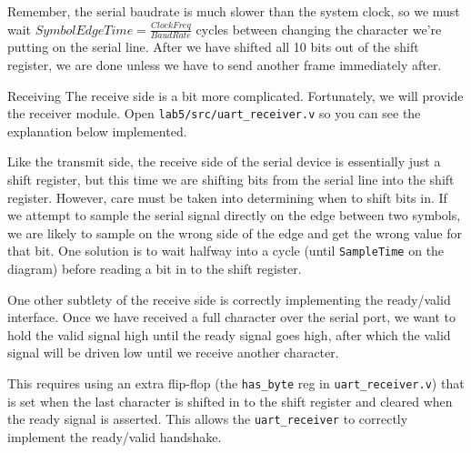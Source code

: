 \documentclass[11pt]{article}
\makeatletter
\renewcommand{\subsection}
{\@startsection {subsection}{1}{0pt}
 {-1ex}
 {0.5ex}
 {\bfseries\normalsize}}
\makeatother
\begin{document}
Remember, the serial baudrate is much slower than the system clock, so we must wait $SymbolEdgeTime = \frac{ClockFreq}{BaudRate}$ cycles between changing the character we're putting on the serial line.
After we have shifted all 10 bits out of the shift register, we are done unless we have to send another frame immediately after.

\subsection{Receiving}
The receive side is a bit more complicated.
Fortunately, we will provide the receiver module.
Open \verb|lab5/src/uart_receiver.v| so you can see the explanation below implemented.

Like the transmit side, the receive side of the serial device is essentially just a shift register, but this time we are shifting bits from the serial line into the shift register.
However, care must be taken into determining when to shift bits in.
If we attempt to sample the serial signal directly on the edge between two symbols, we are likely to sample on the wrong side of the edge and get the wrong value for that bit.
One solution is to wait halfway into a cycle (until \verb|SampleTime| on the diagram) before reading a bit in to the shift register.

One other subtlety of the receive side is correctly implementing the ready/valid interface.
Once we have received a full character over the serial port, we want to hold the valid signal high until the ready signal goes high, after which the valid signal will be driven low until we receive another character.

This requires using an extra flip-flop (the \verb|has_byte| reg in \verb|uart_receiver.v|) that is set when the last character is shifted in to the shift register and cleared when the ready signal is asserted.
This allows the \verb|uart_receiver| to correctly implement the ready/valid handshake.
\end{document}
